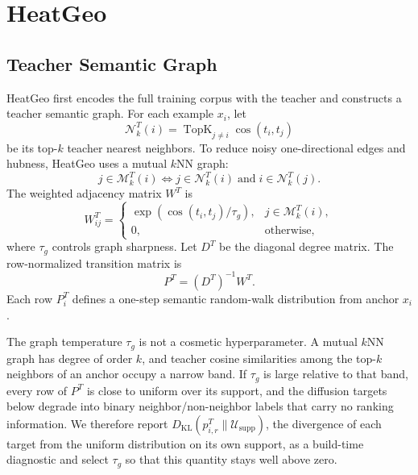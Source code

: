 \section{HeatGeo}
\label{sec:method}

\subsection{Teacher Semantic Graph}

HeatGeo first encodes the full training corpus with the teacher and constructs a teacher semantic graph. For each example $x_i$, let
\begin{equation}
    \mathcal{N}_k^T(i)
    =
    \operatorname{TopK}_{j\neq i}\cos(t_i,t_j)
\end{equation}
be its top-$k$ teacher nearest neighbors. To reduce noisy one-directional edges and hubness, HeatGeo uses a mutual $k$NN graph:
\begin{equation}
    j \in \mathcal{M}_k^T(i)
    \Longleftrightarrow
    j \in \mathcal{N}_k^T(i)
    \;\mathrm{and}\;
    i \in \mathcal{N}_k^T(j).
\end{equation}
The weighted adjacency matrix $W^T$ is
\begin{equation}
    W_{ij}^{T}
    =
    \begin{cases}
    \exp(\cos(t_i,t_j)/\tau_g), & j \in \mathcal{M}_k^T(i),\\
    0, & \mathrm{otherwise},
    \end{cases}
\end{equation}
where $\tau_g$ controls graph sharpness. Let $D^T$ be the diagonal degree matrix. The row-normalized transition matrix is
\begin{equation}
    P^T = (D^T)^{-1}W^T.
\end{equation}
Each row $P_i^T$ defines a one-step semantic random-walk distribution from anchor $x_i$.

The graph temperature $\tau_g$ is not a cosmetic hyperparameter. A mutual $k$NN graph has degree of order $k$, and teacher cosine similarities among the top-$k$ neighbors of an anchor occupy a narrow band. If $\tau_g$ is large relative to that band, every row of $P^T$ is close to uniform over its support, and the diffusion targets below degrade into binary neighbor/non-neighbor labels that carry no ranking information. We therefore report $D_{\mathrm{KL}}(p_{i,r}^T\|\mathcal{U}_{\mathrm{supp}})$, the divergence of each target from the uniform distribution on its own support, as a build-time diagnostic and select $\tau_g$ so that this quantity stays well above zero.

